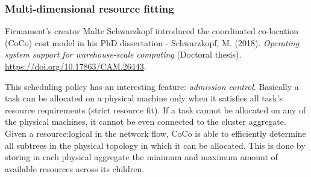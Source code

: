 \subsubsection{Multi-dimensional resource fitting} \label{firmament:multi-dimensions}
Firmament's \cite{firmament} creator Malte Schwarzkopf introduced the coordinated co-location (CoCo) cost model in his PhD dissertation - Schwarzkopf, M. (2018). \textit{Operating system support for warehouse-scale computing} (Doctoral thesis). \href{https://doi.org/10.17863/CAM.26443}{https://doi.org/10.17863/CAM.26443}.\par
This scheduling policy has an interesting feature: \textit{admission control}.
Basically a task can be allocated on a physical machine only when it satisfies all task's resource requirements (strict resource fit).
If a task cannot be allocated on any of the physical machines, it cannot be even connected to the cluster aggregate.
Given a \gls{resource:logical} in the network flow, CoCo is able to efficiently determine all subtrees in the physical topology in which it can be allocated.
This is done by storing in each physical aggregate the minimum and maximum amount of available resources across its children.
